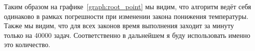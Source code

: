 \documentclass[a4peper, 12pt, titlepage, finall]{extreport}
\begin{document}
            Таким образом на графике~\ref{graph:root_point} мы видим, что алгоритм ведёт себя одинаково в рамках погрешности при изменении закона понижения температуры. 
            Также мы видим, что для всех законов время выполнения заходит за минуту только на 40000 задач. Соответственно в дальнейшем я буду использовать именно это количество.
\end{document}
